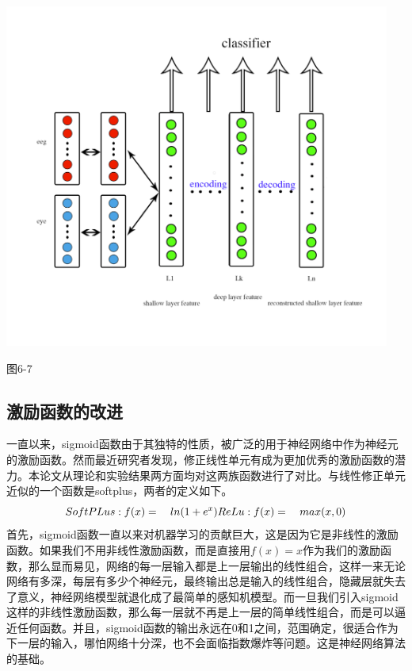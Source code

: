 		\centerline{\includegraphics[width=5in]{figure/classify_all.png}}
		\centerline{图6-7}
		
	\subsection{激励函数的改进}
		
		一直以来，sigmoid函数由于其独特的性质，被广泛的用于神经网络中作为神经元的激励函数。然而最近研究者发现，修正线性单元有成为更加优秀的激励函数的潜力。本论文从理论和实验结果两方面均对这两族函数进行了对比。与线性修正单元近似的一个函数是softplus，两者的定义如下。
		\begin{equation}
		SoftPLus: f(x) = \quad ln(1 + e^x)\\
		ReLu:  f(x) = \quad max(x, 0)
		\end{equation}
		首先，sigmoid函数一直以来对机器学习的贡献巨大，这是因为它是非线性的激励函数。如果我们不用非线性激励函数，而是直接用$f(x) = x$作为我们的激励函数，那么显而易见，网络的每一层输入都是上一层输出的线性组合，这样一来无论网络有多深，每层有多少个神经元，最终输出总是输入的线性组合，隐藏层就失去了意义，神经网络模型就退化成了最简单的感知机模型。而一旦我们引入sigmoid这样的非线性激励函数，那么每一层就不再是上一层的简单线性组合，而是可以逼近任何函数。并且，sigmoid函数的输出永远在0和1之间，范围确定，很适合作为下一层的输入，哪怕网络十分深，也不会面临指数爆炸等问题。这是神经网络算法的基础。
		
